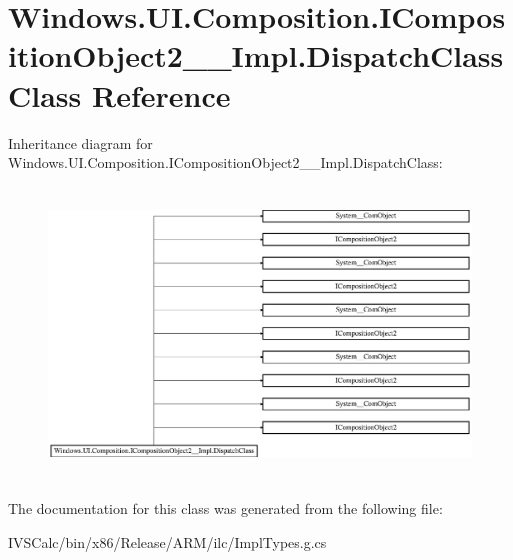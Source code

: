 \hypertarget{class_windows_1_1_u_i_1_1_composition_1_1_i_composition_object2_____impl_1_1_dispatch_class}{}\section{Windows.\+U\+I.\+Composition.\+I\+Composition\+Object2\+\_\+\+\_\+\+Impl.\+Dispatch\+Class Class Reference}
\label{class_windows_1_1_u_i_1_1_composition_1_1_i_composition_object2_____impl_1_1_dispatch_class}
Inheritance diagram for Windows.\+U\+I.\+Composition.\+I\+Composition\+Object2\+\_\+\+\_\+\+Impl.\+Dispatch\+Class\+:\begin{figure}[H]
\begin{center}
\leavevmode
\includegraphics[height=7.777778cm]{class_windows_1_1_u_i_1_1_composition_1_1_i_composition_object2_____impl_1_1_dispatch_class}
\end{center}
\end{figure}


The documentation for this class was generated from the following file\+:\begin{DoxyCompactItemize}
\item 
I\+V\+S\+Calc/bin/x86/\+Release/\+A\+R\+M/ilc/Impl\+Types.\+g.\+cs\end{DoxyCompactItemize}
